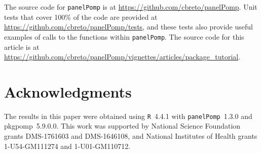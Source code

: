 \documentclass[12pt]{article}\usepackage[]{graphicx}\usepackage[table]{xcolor}
\newcommand\pkg{\texttt}
\newcommand\R{\texttt{R}\xspace}
\newcommand\panelPomp{\texttt{panelPomp}\xspace}
\begin{document}
The source code for \panelPomp is at \url{https://github.com/cbreto/panelPomp}.
Unit tests that cover 100\% of the code are provided at \url{https://github.com/cbreto/panelPomp/tests}, and these tests also provide useful examples of calls to the functions within \panelPomp.
The source code for this article is at \url{https://github.com/cbreto/panelPomp/vignettes/articles/package_tutorial}.

\section*{Acknowledgments}
The results in this paper were obtained using \R~4.4.1 with \pkg{panelPomp}~1.3.0 and pkg{pomp}~5.9.0.0.
This work was supported by National Science Foundation grants DMS-1761603 and DMS-1646108, and National Institutes of Health grants 1-U54-GM111274 and 1-U01-GM110712.




\end{document}
